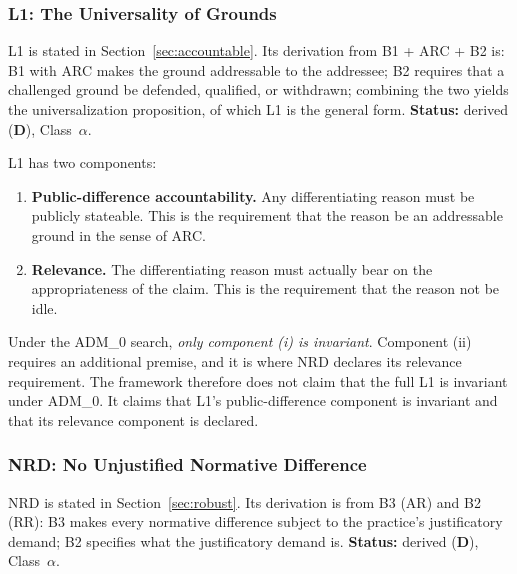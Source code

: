 \documentclass[11pt]{article}
\def\ensuremath#1{#1}%
\def\mathrm#1{#1}%
\newcommand{\statusD}{\textcolor{stD}{\textbf{D}}}
\newcommand{\ADM}{\texorpdfstring{\ensuremath{\mathrm{ADM}_0}}{ADM0}}
\newcommand{\ca}{\texorpdfstring{Class~$\alpha$}{Class alpha}}
\begin{document}
\subsubsection{L1: The Universality of Grounds}
L1 is stated in Section~\ref{sec:accountable}. Its derivation from B1 + ARC + B2 is: B1 with ARC makes the ground addressable to the addressee; B2 requires that a challenged ground be defended, qualified, or withdrawn; combining the two yields the universalization proposition, of which L1 is the general form. \textbf{Status:} derived (\statusD{}), \ca{}.

L1 has two components:
\begin{enumerate}[label=(\roman*)]
\item \textbf{Public-difference accountability.} Any differentiating reason must be publicly stateable. This is the requirement that the reason be an addressable ground in the sense of ARC.
\item \textbf{Relevance.} The differentiating reason must actually bear on the appropriateness of the claim. This is the requirement that the reason not be idle.
\end{enumerate}
Under the \ADM{} search, \emph{only component (i) is invariant}. Component (ii) requires an additional premise, and it is where NRD declares its relevance requirement. The framework therefore does not claim that the full L1 is invariant under \ADM{}. It claims that L1's public-difference component is invariant and that its relevance component is declared.

\subsubsection{NRD: No Unjustified Normative Difference}
NRD is stated in Section~\ref{sec:robust}. Its derivation is from B3 (AR) and B2 (RR): B3 makes every normative difference subject to the practice's justificatory demand; B2 specifies what the justificatory demand is. \textbf{Status:} derived (\statusD{}), \ca{}.
\end{document}
